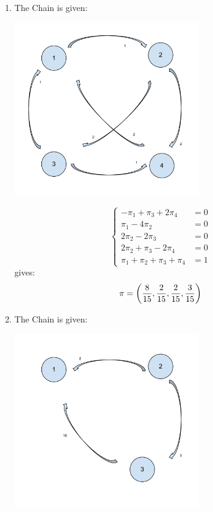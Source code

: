 \documentclass[12pt]{article}
\begin{document}
\begin{enumerate}
\begin{enumerate}
\item The Chain is given:\\


\begin{center}
\includegraphics[width=8cm]{Markov_Chains_Ex_4-e.pdf}
\end{center}


$$ \begin{cases}
-\pi_1+\pi_3+2\pi_4&=0\\
\pi_1-4\pi_2&=0\\
2\pi_2-2\pi_3&=0\\
2\pi_2+\pi_3-2\pi_4&=0\\
\pi_1+\pi_2+\pi_3+\pi_4&=1
\end{cases}$$
gives:
$$\pi=\left({8\over15},{2\over15},{2\over15},{3\over15}\right)$$

\item The Chain is given:\\


\begin{center}
\includegraphics[width=8cm]{Markov_Chains_Ex_4-f.pdf}
\end{center}


\end{enumerate}
\end{enumerate}
\end{document}
